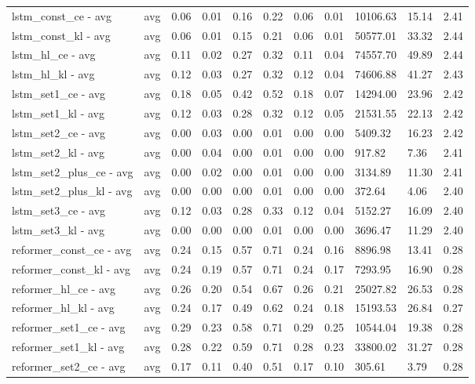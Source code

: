 \begin{longtable}{|p{1.3cm}|p{1.3cm}|p{1.3cm}|p{1.3cm}|p{1.3cm}|p{1.3cm}|p{1.3cm}|p{1.3cm}|p{1.3cm}|p{1.3cm}|p{1.3cm}|}
lstm_const_ce - avg & avg & 0.06 & 0.01 & 0.16 & 0.22 & 0.06 & 0.01 & 10106.63 & 15.14 & 2.41 \\
lstm_const_kl - avg & avg & 0.06 & 0.01 & 0.15 & 0.21 & 0.06 & 0.01 & 50577.01 & 33.32 & 2.44 \\
lstm_hl_ce - avg & avg & 0.11 & 0.02 & 0.27 & 0.32 & 0.11 & 0.04 & 74557.70 & 49.89 & 2.44 \\
lstm_hl_kl - avg & avg & 0.12 & 0.03 & 0.27 & 0.32 & 0.12 & 0.04 & 74606.88 & 41.27 & 2.43 \\
lstm_set1_ce - avg & avg & 0.18 & 0.05 & 0.42 & 0.52 & 0.18 & 0.07 & 14294.00 & 23.96 & 2.42 \\
lstm_set1_kl - avg & avg & 0.12 & 0.03 & 0.28 & 0.32 & 0.12 & 0.05 & 21531.55 & 22.13 & 2.42 \\
lstm_set2_ce - avg & avg & 0.00 & 0.03 & 0.00 & 0.01 & 0.00 & 0.00 & 5409.32 & 16.23 & 2.42 \\
lstm_set2_kl - avg & avg & 0.00 & 0.04 & 0.00 & 0.01 & 0.00 & 0.00 & 917.82 & 7.36 & 2.41 \\
lstm_set2_plus_ce - avg & avg & 0.00 & 0.02 & 0.00 & 0.01 & 0.00 & 0.00 & 3134.89 & 11.30 & 2.41 \\
lstm_set2_plus_kl - avg & avg & 0.00 & 0.00 & 0.00 & 0.01 & 0.00 & 0.00 & 372.64 & 4.06 & 2.40 \\
lstm_set3_ce - avg & avg & 0.12 & 0.03 & 0.28 & 0.33 & 0.12 & 0.04 & 5152.27 & 16.09 & 2.40 \\
lstm_set3_kl - avg & avg & 0.00 & 0.00 & 0.00 & 0.01 & 0.00 & 0.00 & 3696.47 & 11.29 & 2.40 \\
reformer_const_ce - avg & avg & 0.24 & 0.15 & 0.57 & 0.71 & 0.24 & 0.16 & 8896.98 & 13.41 & 0.28 \\
reformer_const_kl - avg & avg & 0.24 & 0.19 & 0.57 & 0.71 & 0.24 & 0.17 & 7293.95 & 16.90 & 0.28 \\
reformer_hl_ce - avg & avg & 0.26 & 0.20 & 0.54 & 0.67 & 0.26 & 0.21 & 25027.82 & 26.53 & 0.28 \\
reformer_hl_kl - avg & avg & 0.24 & 0.17 & 0.49 & 0.62 & 0.24 & 0.18 & 15193.53 & 26.84 & 0.27 \\
reformer_set1_ce - avg & avg & 0.29 & 0.23 & 0.58 & 0.71 & 0.29 & 0.25 & 10544.04 & 19.38 & 0.28 \\
reformer_set1_kl - avg & avg & 0.28 & 0.22 & 0.59 & 0.71 & 0.28 & 0.23 & 33800.02 & 31.27 & 0.28 \\
reformer_set2_ce - avg & avg & 0.17 & 0.11 & 0.40 & 0.51 & 0.17 & 0.10 & 305.61 & 3.79 & 0.28 \\

\end{longtable}
